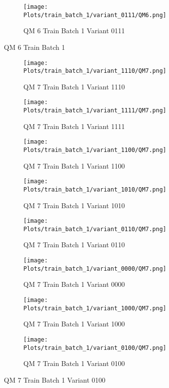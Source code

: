 \documentclass{DissertateFigs}
\begin{document}
\begin{figure}[t!]
\medskip

    \begin{subfigure}{0.47\textwidth}
    \texttt{[image: Plots/train\_batch\_1/variant\_0111/QM6.png]}
    \caption{QM 6 Train Batch 1 Variant 0111}
    \end{subfigure}
\caption{QM 6 Train Batch 1}
    \end{figure}
\clearpage
\begin{figure}[t!]
    \begin{subfigure}{0.47\textwidth}
    \texttt{[image: Plots/train\_batch\_1/variant\_1110/QM7.png]}
    \caption{QM 7 Train Batch 1 Variant 1110}
    \end{subfigure}
    \begin{subfigure}{0.47\textwidth}
    \texttt{[image: Plots/train\_batch\_1/variant\_1111/QM7.png]}
    \caption{QM 7 Train Batch 1 Variant 1111}
    \end{subfigure}

\medskip

    \begin{subfigure}{0.47\textwidth}
    \texttt{[image: Plots/train\_batch\_1/variant\_1100/QM7.png]}
    \caption{QM 7 Train Batch 1 Variant 1100}
    \end{subfigure}
    \begin{subfigure}{0.47\textwidth}
    \texttt{[image: Plots/train\_batch\_1/variant\_1010/QM7.png]}
    \caption{QM 7 Train Batch 1 Variant 1010}
    \end{subfigure}

\medskip

    \begin{subfigure}{0.47\textwidth}
    \texttt{[image: Plots/train\_batch\_1/variant\_0110/QM7.png]}
    \caption{QM 7 Train Batch 1 Variant 0110}
    \end{subfigure}
    \begin{subfigure}{0.47\textwidth}
    \texttt{[image: Plots/train\_batch\_1/variant\_0000/QM7.png]}
    \caption{QM 7 Train Batch 1 Variant 0000}
    \end{subfigure}

\medskip

    \begin{subfigure}{0.47\textwidth}
    \texttt{[image: Plots/train\_batch\_1/variant\_1000/QM7.png]}
    \caption{QM 7 Train Batch 1 Variant 1000}
    \end{subfigure}
    \begin{subfigure}{0.47\textwidth}
    \texttt{[image: Plots/train\_batch\_1/variant\_0100/QM7.png]}
    \caption{QM 7 Train Batch 1 Variant 0100}
    \end{subfigure}


\end{figure}
\end{document}
